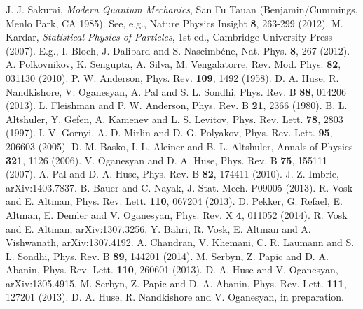 \documentclass[amsmath,onecolumn, superscriptaddress,preprint,aps]{revtex4}
\begin{document}
\begin{thebibliography}{99}
J. J. Sakurai, {\it Modern Quantum Mechanics}, San Fu Tauan (Benjamin/Cummings, Menlo Park, CA 1985).
See, e.g., Nature Physics Insight {\bf 8}, 263-299 (2012).
M. Kardar, {\it Statistical Physics of Particles}, 1st ed., Cambridge University Press (2007).
E.g., I. Bloch, J. Dalibard and S. Nascimbéne, Nat. Phys. {\bf 8}, 267 (2012).
A. Polkovnikov, K. Sengupta, A. Silva, M. Vengalatorre, Rev. Mod. Phys. {\bf 82}, 031130 (2010).
P. W. Anderson,
Phys. Rev. {\bf 109}, 1492 (1958).
D. A. Huse, R. Nandkishore, V. Oganesyan, A. Pal and S. L. Sondhi, Phys. Rev. B {\bf 88}, 014206 (2013).
L. Fleishman and P. W. Anderson, Phys. Rev. B {\bf 21}, 2366 (1980).
B. L. Altshuler, Y. Gefen, A. Kamenev and L. S. Levitov, Phys. Rev. Lett. {\bf 78}, 2803 (1997).
I. V. Gornyi, A. D. Mirlin and D. G. Polyakov, Phys. Rev. Lett. {\bf 95}, 206603 (2005).
D. M. Basko, I. L. Aleiner and B. L. Altshuler, Annals of Physics {\bf 321}, 1126 (2006).
V. Oganesyan and D. A. Huse,
Phys. Rev. B {\bf 75}, 155111 (2007).
A. Pal and D. A. Huse,
Phys. Rev. B {\bf 82}, 174411 (2010).
J. Z. Imbrie, arXiv:1403.7837.
B. Bauer and C. Nayak, J. Stat. Mech. P09005 (2013).
R. Vosk and E. Altman, Phys. Rev. Lett. {\bf 110}, 067204 (2013).
D. Pekker, G. Refael, E. Altman, E. Demler and V. Oganesyan, Phys. Rev. X {\bf 4}, 011052 (2014).
R. Vosk and E. Altman, arXiv:1307.3256.
Y. Bahri, R. Vosk, E. Altman and A. Vishwanath, arXiv:1307.4192.
A. Chandran, V. Khemani, C. R. Laumann and S. L. Sondhi, Phys. Rev. B {\bf 89}, 144201 (2014).
M. Serbyn, Z. Papic and D. A. Abanin, Phys. Rev. Lett. {\bf 110}, 260601 (2013).
D. A. Huse and V. Oganesyan, arXiv:1305.4915.
M. Serbyn, Z. Papic and D. A. Abanin, Phys. Rev. Lett. {\bf 111}, 127201 (2013).
D. A. Huse, R. Nandkishore and V. Oganesyan, in preparation.

\end{thebibliography}
\end{document}
